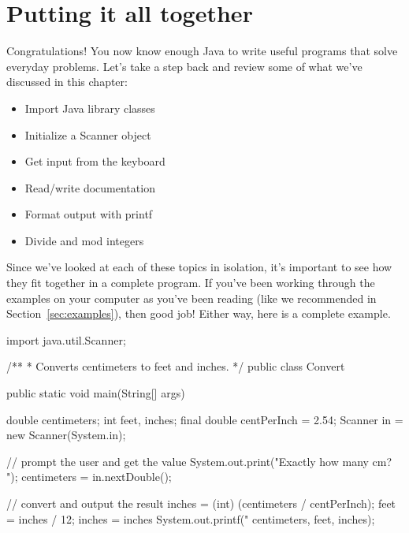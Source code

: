 \section{Putting it all together}

Congratulations!
You now know enough Java to write useful programs that solve everyday problems.
Let's take a step back and review some of what we've discussed in this chapter:

\begin{multicols}{2}
\begin{itemize}



\item Import Java library classes
\item Initialize a Scanner object
\item Get input from the keyboard
\item Read/write documentation
\item Format output with printf
\item Divide and mod integers

\end{itemize}
\end{multicols}

Since we've looked at each of these topics in isolation, it's important to see how they fit together in a complete program.
If you've been working through the examples on your computer as you've been reading (like we recommended in Section~\ref{sec:examples}), then good job!
Either way, here is a complete example.

\begin{code}
import java.util.Scanner;

/**
 * Converts centimeters to feet and inches.
 */
public class Convert {
    public static void main(String[] args) {
        double centimeters;
        int feet, inches;
        final double centPerInch = 2.54;
        Scanner in = new Scanner(System.in);

        // prompt the user and get the value
        System.out.print("Exactly how many cm? ");
        centimeters = in.nextDouble();

        // convert and output the result
        inches = (int) (centimeters / centPerInch);
        feet = inches / 12;
        inches = inches %
        System.out.printf("%
                          centimeters, feet, inches);
    }
}
\end{code}

